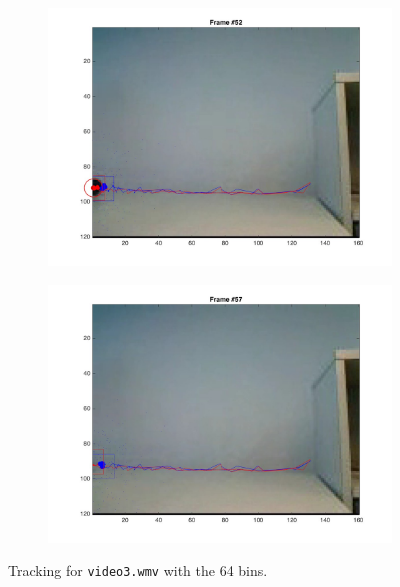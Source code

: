 \documentclass{ethz_report}
\begin{document}
\begin{figure}[h]
\begin{subfigure}[b]{.25\textwidth}
        \includegraphics[width=1\linewidth]{images/video3_bins_high_51}
    \end{subfigure}%
    \begin{subfigure}[b]{.25\textwidth}
        \centering
        \includegraphics[width=1\linewidth]{images/video3_bins_high_56}
    \end{subfigure}
    \caption{Tracking for \texttt{video3.wmv} with the 64 bins.}
    \label{fig:tracking_video3_bins_high}
\end{figure}
\end{document}
